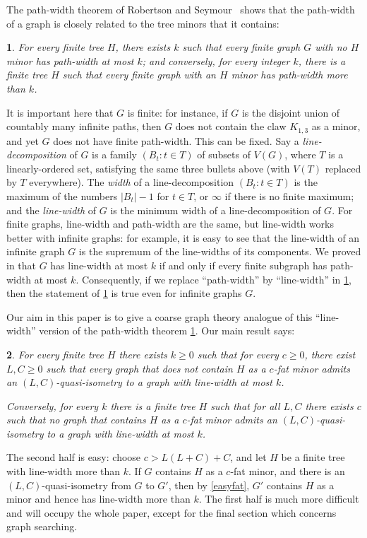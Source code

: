 \documentclass[titlepage,11pt]{article}
\newtheorem{thm}{}[section]
\begin{document}
	The path-width theorem of Robertson and Seymour~\cite{GM1} shows that the path-width of a graph is closely related to the tree minors that it contains:
	\begin{thm}\label{GM1} 
		For every finite tree $H$, there exists $k$ such that every finite graph $G$ with no $H$ minor has path-width at most $k$; and conversely, for every integer $k$, there is a finite tree $H$ such that every finite graph with an $H$ minor has path-width more than $k$.
	\end{thm}
	It is important here that $G$ is finite: for instance, if $G$ is the disjoint union of countably many infinite paths, then $G$ does not contain
	the claw $K_{1,3}$ as a minor, and yet $G$ does not have finite path-width. This can be fixed. Say a {\em line-decomposition} of $G$ is a family
	$(B_t:t\in T)$ of subsets of $V(G)$, where $T$ is a linearly-ordered set, satisfying the same three bullets above (with $V(T)$ replaced by $T$ everywhere).
	The {\em width} of a line-decomposition $(B_t:t\in T)$ is the maximum of the numbers $|B_t|-1$ for $t\in T$,
	or $\infty$ if there is no finite maximum;
	and the {\em line-width} of $G$ is the minimum width of a line-decomposition of $G$.  For finite graphs, line-width and path-width are the same, but line-width works better with infinite graphs: for example, it is easy to see that the line-width of an infinite graph $G$ is the supremum of the line-widths of its components.   We proved in \cite{subtrees} that $G$ has line-width at most $k$
	if and only if every finite subgraph has path-width at most $k$. Consequently, if we replace ``path-width'' by ``line-width'' in \ref{GM1}, then the statement
	of \ref{GM1} is true even for infinite graphs $G$.
	
	
	Our aim in this paper is to give a coarse graph theory analogue of this ``line-width'' version of the path-width theorem \ref{GM1}.
	Our main result says:
	\begin{thm}\label{mainthm}
		For every finite tree $H$ there exists $k\ge 0$ such that for every $c\ge 0$, there exist $L,C\ge 0$ such that every graph
		that does not contain $H$ as a $c$-fat minor admits an $(L,C)$-quasi-isometry to a graph with line-width at most $k$. 
		
		Conversely,
		for every $k$ there is a finite tree $H$ such that for all $L,C$ there exists $c$ such that no graph that contains $H$ as a $c$-fat minor admits an
		$(L,C)$-quasi-isometry to a graph with line-width at most $k$.
	\end{thm}
	The second half is easy: choose $c> L(L+C)+C$, and let $H$ be a finite tree with line-width more than $k$. If $G$ contains $H$ as a $c$-fat minor,
	and there is an $(L,C)$-quasi-isometry from $G$ to $G'$, then by \ref{easyfat}, $G'$ contains $H$ as a minor and hence has line-width more than $k$. 
	The first half is much more difficult and will occupy the whole paper, except for the final section which concerns graph searching.
	
\end{document}
